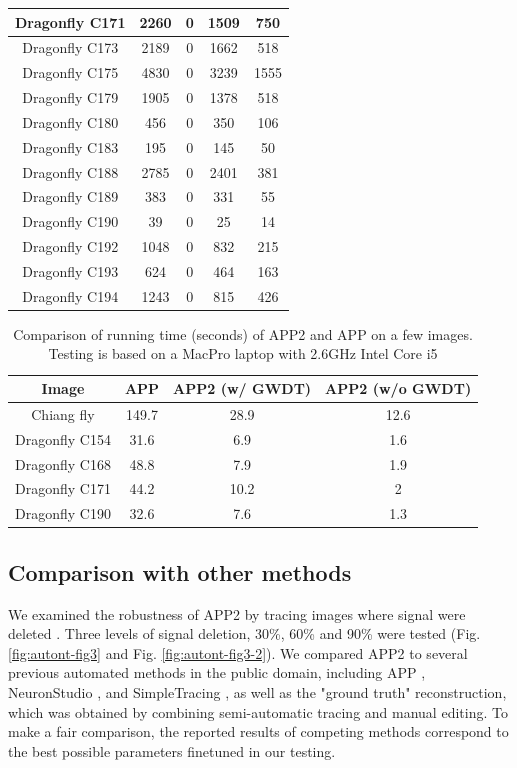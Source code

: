 \begin{table}
\begin{center}
\begin{tabular}{ccccc}
Dragonfly C171 &	2260 &	0 &	1509 &	750\\ \hline
Dragonfly C173 &	2189 &	0 &	1662 &	518\\ \hline
Dragonfly C175 &	4830 &	0 &	3239 &	1555\\ \hline
Dragonfly C179 &	1905 &	0 &	1378 &	518\\ \hline
Dragonfly C180 &	456	& 0	& 350 &	106\\ \hline
Dragonfly C183 &	195	& 0	& 145 &	50\\ \hline
Dragonfly C188 &	2785 &	0 &	2401 &	381\\ \hline
Dragonfly C189 &	383	& 0	& 331 &	55\\ \hline
Dragonfly C190 &	39	& 0	& 25 &	14\\ \hline
Dragonfly C192 &	1048 &	0 &	832 &	215\\ \hline
Dragonfly C193 &	624	& 0	& 464 &	163\\ \hline
Dragonfly C194 &	1243 &	0 &	815 &	426\\ \hline
    \end{tabular}
\end{center}
\end{table}

\begin{table} \label{tab:autont-tab2}
\caption{Comparison of running time (seconds) of APP2 and APP on a few images. Testing is based on a MacPro laptop with 2.6GHz Intel Core i5}
\begin{center}
\begin{tabular}{cccc}
\hline
Image	& APP &	APP2 (w/ GWDT)	& APP2 (w/o GWDT) \\ \hline
Chiang fly & 149.7 &	28.9 &	12.6 \\ \hline
Dragonfly C154 &	31.6 &	6.9 &	1.6 \\ \hline
Dragonfly C168 &	48.8 &	7.9	& 1.9 \\ \hline
Dragonfly C171 &	44.2 &	10.2 &	2 \\ \hline
Dragonfly C190 &	32.6 &	7.6	& 1.3 \\ \hline
\end{tabular}
\end{center}
\end{table}

\subsection{Comparison with other methods}
We examined the robustness of APP2 by tracing images where signal were deleted \cite{peng2010automatic}. Three levels of signal deletion, 30\%, 60\% and 90\% were tested (Fig. \ref{fig:autont-fig3} and Fig. \ref{fig:autont-fig3-2}). We compared APP2 to several previous automated methods in the public domain, including APP \cite{peng2011automatic}, NeuronStudio \cite{rodriguez2008automated}, and SimpleTracing \cite{yang2013distance} , as well as the "ground truth" reconstruction, which was obtained by combining semi-automatic tracing and manual editing. To make a fair comparison, the reported results of competing methods correspond to the best possible parameters finetuned in our testing. 

